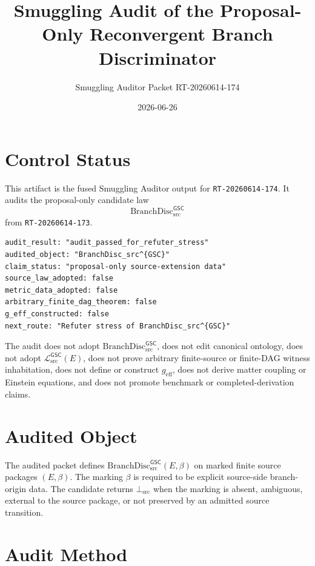 \documentclass[11pt]{article}
\title{Smuggling Audit of the Proposal-Only Reconvergent Branch Discriminator}
\author{Smuggling Auditor Packet RT-20260614-174}
\date{2026-06-26}
\newcommand{\MetricData}{\mathcal{L}_{\mathrm{src}}^{\mathsf{GSC}}}
\newcommand{\BottomSrc}{\bot_{\mathrm{src}}}
\newcommand{\geff}{g_{\mathrm{eff}}}
\newcommand{\BranchDisc}{\mathrm{BranchDisc}_{\mathrm{src}}^{\mathsf{GSC}}}
\begin{document}
\maketitle

\section{Control Status}

This artifact is the fused Smuggling Auditor output for
\texttt{RT-20260614-174}. It audits the proposal-only candidate law
\[
  \BranchDisc
\]
from \texttt{RT-20260614-173}.

\begin{verbatim}
audit_result: "audit_passed_for_refuter_stress"
audited_object: "BranchDisc_src^{GSC}"
claim_status: "proposal-only source-extension data"
source_law_adopted: false
metric_data_adopted: false
arbitrary_finite_dag_theorem: false
g_eff_constructed: false
next_route: "Refuter stress of BranchDisc_src^{GSC}"
\end{verbatim}

The audit does not adopt \(\BranchDisc\), does not edit canonical ontology,
does not adopt \(\MetricData(E)\), does not prove arbitrary finite-source or
finite-DAG witness inhabitation, does not define or construct \(\geff\), does
not derive matter coupling or Einstein equations, and does not promote
benchmark or completed-derivation claims.

\section{Audited Object}

The audited packet defines \(\BranchDisc(E,\beta)\) on marked finite source
packages \((E,\beta)\). The marking \(\beta\) is required to be explicit
source-side branch-origin data. The candidate returns \(\BottomSrc\) when the
marking is absent, ambiguous, external to the source package, or not preserved
by an admitted source transition.

\section{Audit Method}
\end{document}
